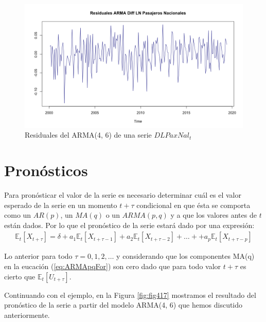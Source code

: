 \documentclass[
]{book}
\begin{document}
\begin{figure}

{\centering \includegraphics[width=0.95\linewidth]{Plots/G_Residuals_ARMA46_D} 

}

\caption{Residuales del ARMA(4, 6) de una serie $DLPaxNal_t$}\label{fig:fig416}
\end{figure}

\hypertarget{pronuxf3sticos}{%
\section{Pronósticos}\label{pronuxf3sticos}}

Para pronósticar el valor de la serie es necesario determinar cuál es el valor esperado de la serie en un momento \(t + \tau\) condicional en que ésta se comporta como un \(AR(p)\), un \(MA(q)\) o un \(ARMA(p, q)\) y a que los valores antes de \(t\) están dados. Por lo que el pronóstico de la serie estará dado por una expresión:
\begin{eqnarray}
    \mathbb{E}_t[X_{t+\tau}] = \delta + a_1 \mathbb{E}_t[X_{t+\tau-1}] + a_2 \mathbb{E}_t[X_{t+\tau-2}] + \ldots + + a_p \mathbb{E}_t[X_{t+\tau-p}]
    \label{eq:ARMApqFor}
\end{eqnarray}

Lo anterior para todo \(\tau = 0, 1, 2, \ldots\) y considerando que los componentes MA(q) en la eucación (\eqref{eq:ARMApqFor}) son cero dado que para todo valor \(t + \tau\) es cierto que \(\mathbb{E}_t[U_{t+\tau}]\).

Continuando con el ejemplo, en la Figura \ref{fig:fig417} mostramos el resultado del pronóstico de la serie a partir del modelo ARMA(4, 6) que hemos discutido anteriormente.
\end{document}
